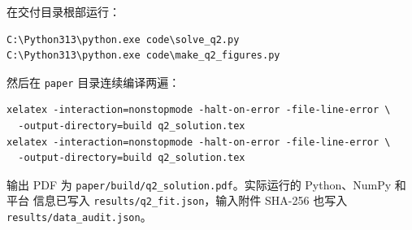 \documentclass[UTF8,12pt,a4paper]{ctexart}
\begin{document}
在交付目录根部运行：
\begin{verbatim}
C:\Python313\python.exe code\solve_q2.py
C:\Python313\python.exe code\make_q2_figures.py
\end{verbatim}
然后在 \verb|paper| 目录连续编译两遍：
\begin{verbatim}
xelatex -interaction=nonstopmode -halt-on-error -file-line-error \
  -output-directory=build q2_solution.tex
xelatex -interaction=nonstopmode -halt-on-error -file-line-error \
  -output-directory=build q2_solution.tex
\end{verbatim}
输出 PDF 为 \verb|paper/build/q2_solution.pdf|。实际运行的 Python、NumPy 和平台
信息已写入 \verb|results/q2_fit.json|，输入附件 SHA-256 也写入
\verb|results/data_audit.json|。
\end{document}
